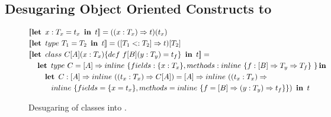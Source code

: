\subsection{Desugaring Object Oriented Constructs to \calculus}
\label{sct:desugaring}

\begin{figure*}
\begin{alignat*}{2}
   & [\![ \klet\ x: T_x = t_x\ \kin \ t ]\!] = ((x: T_x) \ra t)(t_x)\\
   & [\![ \klet\ type\ T_1 = T_2\ \kin\ t ]\!] =  ([T_1 <: T_2] \ra t)[T_2] \\
   & [\![ \klet\ class\ C[A](x: T_x) \{ def\ f[B](y: T_y) = t_f \}\ \kin\ t ]\!]  =  \\
   & \quad   \klet\ type\  C = [A] \ra \inline \{ fields: \{ x: T_x \}, methods: \inline \{ f: [B] \ra T_y \ra T_f \}\ \} \kin  \\
   & \quad \quad \klet\ C: [A] \ra \inline((t_x: T_x) \ra C[A])  =  [A] \ra \inline((t_x: T_x) \ra\\
   & \quad \quad \quad  \inline \{ fields = \{x = t_x\}, methods = \inline \{f = [B] \ra (y: T_y) \ra t_f \}\}) \ \kin\ t
\end{alignat*}
\caption{Desugaring of classes into \calculus.}
\label{fig:desugaring-classes}
\end{figure*}


